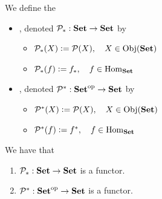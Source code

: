 \documentclass{book}
\begin{document}
\begin{defn}
	We define the 
	\begin{itemize}
		\item {}, denoted $\mathcal{P}_*: \text{\textbf{Set}} \rightarrow \text{\textbf{Set}}$ by 
		\begin{itemize}
			\item $\mathcal{P}_*(X) \vcentcolon= \mathcal{P}(X), \quad X \in \operatorname{Obj}(\text{\textbf{Set}})$
			\item $\mathcal{P}_*(f) \vcentcolon= f_*, \quad f \in \operatorname{Hom}_{\text{\textbf{Set}}}$
		\end{itemize}
		\item 
		, denoted $\mathcal{P}^*: {\text{\textbf{Set}}}^{\text{op}} \rightarrow \text{\textbf{Set}}$ by 
		\begin{itemize}
			\item $\mathcal{P}^*(X) \vcentcolon= \mathcal{P}(X), \quad X \in \operatorname{Obj}(\text{\textbf{Set}})$
			\item $\mathcal{P}^*(f) \vcentcolon= f^*, \quad f \in \operatorname{Hom}_{\text{\textbf{Set}}}$
		\end{itemize}
	\end{itemize}
\end{defn}

\begin{ex}
	We have that 
	\begin{enumerate}
		\item $\mathcal{P}_*: \text{\textbf{Set}} \rightarrow \text{\textbf{Set}}$ is a functor.
		\item $\mathcal{P}^*: {\text{\textbf{Set}}}^{\text{op}} \rightarrow \text{\textbf{Set}}$ is a functor.
	\end{enumerate}
\end{ex}
\end{document}
